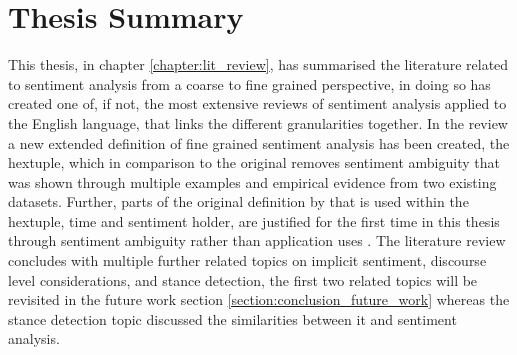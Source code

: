 \FloatBarrier
\section{Thesis Summary}
This thesis, in chapter \ref{chapter:lit_review}, has summarised the literature related to sentiment analysis from a coarse to fine grained perspective, in doing so has created one of, if not, the most extensive reviews of sentiment analysis applied to the English language, that links the different granularities together. In the review a new extended definition of fine grained sentiment analysis has been created, the hextuple, which in comparison to the original \citep{liu2015sentiment} removes sentiment ambiguity that was shown through multiple examples and empirical evidence from two existing datasets. Further, parts of the original definition by \citet{liu2015sentiment} that is used within the hextuple, time and sentiment holder, are justified for the first time in this thesis through sentiment ambiguity rather than application uses \citep{liu2015sentiment}. The literature review concludes with multiple further related topics on implicit sentiment, discourse level considerations, and stance detection, the first two related topics will be revisited in the future work section \ref{section:conclusion_future_work} whereas the stance detection topic discussed the similarities between it and sentiment analysis.

